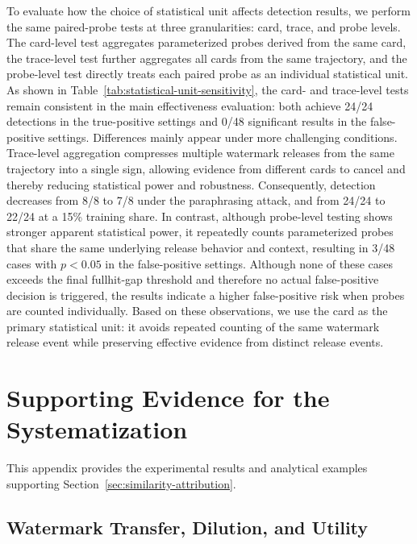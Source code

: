 To evaluate how the choice of statistical unit affects detection results, we perform the same paired-probe tests at three granularities: card, trace, and probe levels. The card-level test aggregates parameterized probes derived from the same card, the trace-level test further aggregates all cards from the same trajectory, and the probe-level test directly treats each paired probe as an individual statistical unit. As shown in Table~\ref{tab:statistical-unit-sensitivity}, the card- and trace-level tests remain consistent in the main effectiveness evaluation: both achieve 24/24 detections in the true-positive settings and 0/48 significant results in the false-positive settings. Differences mainly appear under more challenging conditions. Trace-level aggregation compresses multiple watermark releases from the same trajectory into a single sign, allowing evidence from different cards to cancel and thereby reducing statistical power and robustness. Consequently, detection decreases from 8/8 to 7/8 under the paraphrasing attack, and from 24/24 to 22/24 at a 15\% training share. In contrast, although probe-level testing shows stronger apparent statistical power, it repeatedly counts parameterized probes that share the same underlying release behavior and context, resulting in 3/48 cases with $p<0.05$ in the false-positive settings. Although none of these cases exceeds the final fullhit-gap threshold and therefore no actual false-positive decision is triggered, the results indicate a higher false-positive risk when probes are counted individually. Based on these observations, we use the card as the primary statistical unit: it avoids repeated counting of the same watermark release event while preserving effective evidence from distinct release events.











\section{Supporting Evidence for the Systematization}
\label{sec:systematization-details}

This appendix provides the experimental results and analytical examples
supporting Section~\ref{sec:similarity-attribution}.

\subsection{Watermark Transfer, Dilution, and Utility}
\label{sec:watermark-limitations}

